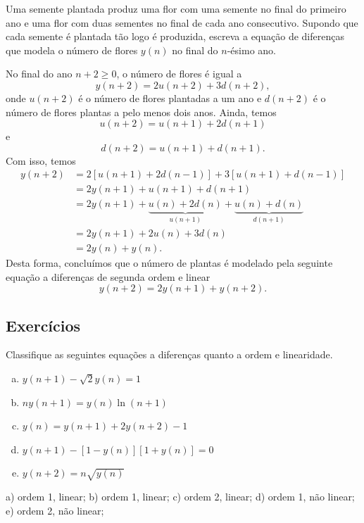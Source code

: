 \begin{exeresol}
  Uma semente plantada produz uma flor com uma semente no final do primeiro ano e uma flor com duas sementes no final de cada ano consecutivo. Supondo que cada semente é plantada tão logo é produzida, escreva a equação de diferenças que modela o número de flores $y(n)$ no final do $n$-ésimo ano.
\end{exeresol}
\begin{resol}
  No final do ano $n+2\geq 0$, o número de flores é igual a
  \begin{equation}
    y(n+2) = 2u(n+2) + 3d(n+2),
  \end{equation}
  onde $u(n+2)$ é o número de flores plantadas a um ano e $d(n+2)$ é o número de flores plantas a pelo menos dois anos. Ainda, temos
  \begin{equation}
    u(n+2) = u(n+1) + 2d(n+1)
  \end{equation}
  e
  \begin{equation}
    d(n+2) = u(n+1) + d(n+1).
  \end{equation}
  Com isso, temos
  \begin{align}
    y(n+2) &= 2\left[u(n+1)+2d(n-1)\right] + 3\left[u(n+1)+d(n-1)\right] \\
          &= 2y(n+1) + u(n+1) + d(n+1) \\
          &= 2y(n+1) + \underbrace{u(n) + 2d(n)}_{u(n+1)} + \underbrace{u(n) + d(n)}_{d(n+1)} \\
          &= 2y(n+1) + 2u(n) + 3d(n) \\
          &= 2y(n) + y(n).
  \end{align}
  Desta forma, concluímos que o número de plantas é modelado pela seguinte equação a diferenças de segunda ordem e linear
  \begin{equation}
    y(n+2) = 2y(n+1) + y(n+2).
  \end{equation}
\end{resol}

\subsection*{Exercícios}

\begin{exer}
  Classifique as seguintes equações a diferenças quanto a ordem e linearidade.
  \begin{enumerate}[a)]
  \item $\displaystyle y(n+1)-\sqrt{2}y(n) = 1$
  \item $\displaystyle ny(n+1) = y(n)\ln(n+1)$
  \item $\displaystyle y(n) = y(n+1) + 2y(n+2) - 1$
  \item $\displaystyle y(n+1) - \left[1-y(n)\right]\left[1+y(n)\right] = 0$
  \item $\displaystyle y(n+2) = n\sqrt{y(n)}$
  \end{enumerate}
\end{exer}
\begin{resp}
  a) ordem 1, linear; b) ordem 1, linear; c) ordem 2, linear; d) ordem 1, não linear; e) ordem 2, não linear;
\end{resp}

